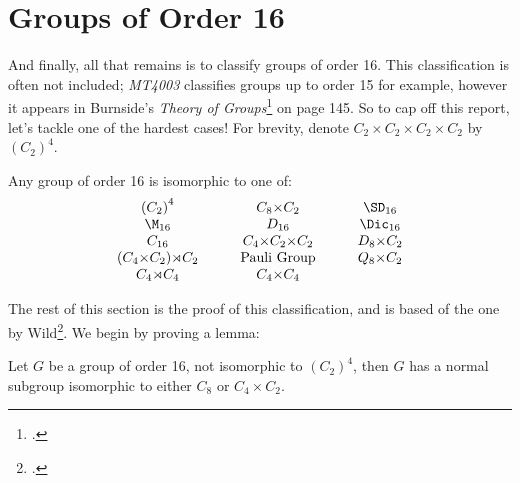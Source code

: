 \section{Groups of Order 16}
And finally, all that remains is to classify groups of order 16.
This classification is often not included; \textit{MT4003} classifies groups up to order 15 for example, however it
appears in Burnside's \textit{Theory of Groups}\footcite[p145]{burnside1911} on page 145.
So to cap off this report, let's tackle one of the hardest cases!
For brevity, denote \(C_2 {\times} C_2 {\times} C_2 {\times} C_2\) by \({(C_2)}^4\).


\begin{theorem}
    Any group of order 16 is isomorphic to one of:
    \begin{displaymath}
    \begin{array}{c@{\hskip 3em}c@{\hskip 3em}c}
        {(C_2)}^4 & C_8 {\times} C_2 & \SD_{16} \\
        \M_{16} & D_{16} & \Dic_{16} \\
        C_{16} & C_4 {\times} C_2 {\times} C_2 & D_8 {\times} C_2 \\
        (C_4 {\times} C_2) {\rtimes} C_2 & \text{Pauli Group} & Q_8 {\times} C_2 \\
        C_4 {\rtimes} C_4 & C_4 {\times} C_4 & \\
    \end{array}
    \end{displaymath}
\end{theorem}

The rest of this section is the proof of this classification, and is based of the one by Wild\footcite{order16}.
We begin by proving a lemma:

\begin{lemma}\label{lem:order_16_subgp}
    \raggedright
    Let \(G\) be a group of order 16, not isomorphic to \({(C_2)}^4\), then \(G\) has a
    normal subgroup isomorphic to either \(C_8\) or \(C_4 \times C_2\).
\end{lemma}

